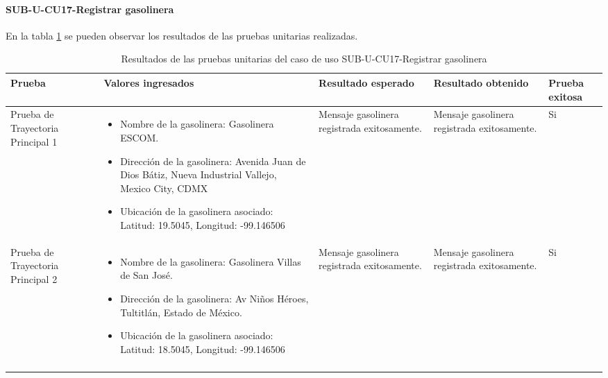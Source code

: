 \paragraph{SUB-U-CU17-Registrar gasolinera}\label{SUB-U-CU17:Pruebas}
En la tabla \ref{pruebas_unitarias_sub-u-cu17} se pueden observar los resultados de las pruebas unitarias realizadas.
\begin{longtable}{|M{2cm}| M{4.5cm}|M{3cm}|M{3cm}|M{1.5cm}|}
	\hline
	\textbf{Prueba} & \textbf{Valores ingresados} & \textbf{Resultado esperado} & \textbf{Resultado obtenido} & \textbf{Prueba exitosa} \\ \hline
	Prueba de Trayectoria Principal 1 & 
	\begin{itemize}
		\item Nombre de la gasolinera: Gasolinera ESCOM.
		\item Dirección de la gasolinera: Avenida Juan de Dios Bátiz, Nueva Industrial Vallejo, Mexico City, CDMX
		\item Ubicación de la gasolinera asociado: Latitud: 19.5045, Longitud: -99.146506
	\end{itemize}
	& 
	Mensaje gasolinera registrada exitosamente.
	&
	Mensaje gasolinera registrada exitosamente.
	& Si \\ \hline
	Prueba de Trayectoria Principal 2 &
	\begin{itemize}
		\item Nombre de la gasolinera: Gasolinera Villas de San José.
		\item Dirección de la gasolinera: Av Niños Héroes, Tultitlán, Estado de México.
		\item Ubicación de la gasolinera asociado: Latitud: 18.5045, Longitud: -99.146506
	\end{itemize}
	& 
	Mensaje gasolinera registrada exitosamente.
	&
	Mensaje gasolinera registrada exitosamente.
	& Si \\ \hline
	\caption{Resultados de las pruebas unitarias del caso de uso SUB-U-CU17-Registrar gasolinera}
	\label{pruebas_unitarias_sub-u-cu17}
\end{longtable}